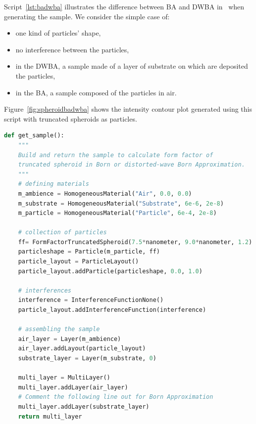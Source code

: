 Script~\ref{lst:badwba} illustrates the difference between BA and DWBA in \BornAgain\ when generating the sample.  We consider the simple case of:
\begin{itemize}
\item one kind of particles' shape,
\item no interference between the particles,
\item in the DWBA, a sample made of a layer of substrate on which are deposited the particles,
\item in the BA, a sample composed of the particles in air.
\end{itemize} 

Figure~\ref{fig:spheroidbadwba} shows the intensity contour plot generated using this script with truncated spheroids as particles.

\newpage

\begin{lstlisting}[language=python, style=eclipseboxed,numbers=none,nolol,caption={\Code{Python} script to generate a sample using Born (BA) or distorted-wave Born approximation (DWBA). The difference between BA and DWBA in this simple case is the absence or presence of a substrate layer in the sample.},label={lst:badwba}]
def get_sample():
    """
    Build and return the sample to calculate form factor of 
    truncated spheroid in Born or distorted-wave Born Approximation.
    """
    # defining materials
    m_ambience = HomogeneousMaterial("Air", 0.0, 0.0)
    m_substrate = HomogeneousMaterial("Substrate", 6e-6, 2e-8)
    m_particle = HomogeneousMaterial("Particle", 6e-4, 2e-8)

    # collection of particles
    ff= FormFactorTruncatedSpheroid(7.5*nanometer, 9.0*nanometer, 1.2)
    particleshape = Particle(m_particle, ff)
    particle_layout = ParticleLayout()
    particle_layout.addParticle(particleshape, 0.0, 1.0)

    # interferences
    interference = InterferenceFunctionNone()
    particle_layout.addInterferenceFunction(interference)

    # assembling the sample
    air_layer = Layer(m_ambience)
    air_layer.addLayout(particle_layout)
    substrate_layer = Layer(m_substrate, 0)

    multi_layer = MultiLayer()
    multi_layer.addLayer(air_layer)
    # Comment the following line out for Born Approximation
    multi_layer.addLayer(substrate_layer)
    return multi_layer
\end{lstlisting}


